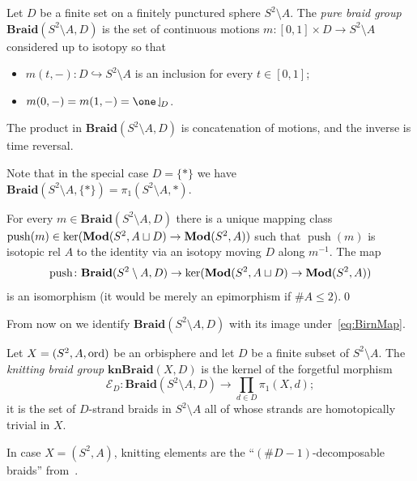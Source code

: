 \documentclass{amsart}
\newcommand\Antipush{{\mathcal E}}
\newcommand\Push{{\operatorname{push}}}
\newcommand\Braid{{\mathbf{Braid}}}
\newcommand\knBraid{{\mathbf{knBraid}}}
\begin{document}
\begin{defn}
\label{defn:PureBraidGroup}
  Let $D$ be a finite set on a finitely punctured sphere
  $S^2\setminus A$. The \emph{pure braid group} $\Braid(S^2\setminus A,D)$
  is the set of continuous motions
  $m\colon[0,1]\times D\to S^2\setminus A$ considered up to isotopy so
  that
  \begin{itemize}
  \item $m(t,-)\colon D\hookrightarrow S^2\setminus A$ is an inclusion
    for every $t\in [0,1]$;
  \item $m(0,-)=m(1,-)=\one\restrict D$.
  \end{itemize}
  The product in $\Braid(S^2\setminus A,D)$ is concatenation of
  motions, and the inverse is time reversal.
\end{defn}
\noindent Note that in the special case $D=\{*\}$ we have
$\Braid(S^2\setminus A,\{*\} )=\pi_1(S^2\setminus A, *)$.

\begin{thm}[Birman]\label{thm:BirmExistUniq}
  For every $m\in \Braid(S^2\setminus A,D)$ there is a unique mapping
  class $\Push(m)\in\ker(\Mod(S^2,A\sqcup D)\to\Mod(S^2,A))$ such that
  $\Push(m)$ is isotopic rel $A$ to the identity via an isotopy moving
  $D$ along $m^{-1}$. The map
  \begin{equation}\label{eq:BirnMap}
    \Push\colon \Braid(S^2\setminus A,D)\to\ker(\Mod(S^2,A\sqcup D)\to\Mod(S^2,A))
  \end{equation}
  is an isomorphism (it would be merely an epimorphism if $\#A\le2$).\qed
\end{thm}

\noindent From now on we identify $\Braid(S^2\setminus A,D)$ with its
image under~\eqref{eq:BirnMap}.

\begin{defn}
  Let $X= (S^2,A,\operatorname{ord})$ be an orbisphere and let $D$ be a finite
  subset of $S^2\setminus A$. The \emph{knitting braid group}
  $\knBraid(X,D)$ is the kernel of the forgetful morphism
  \[\Antipush_D\colon\Braid(S^2\setminus A, D)\to\prod_{d\in D}\pi_1(X,d);\]
  it is the set of $D$-strand braids in $S^2\setminus A$ all of whose
  strands are homotopically trivial in $X$.
\end{defn}

In case $X=(S^2,A)$, knitting elements are the
``$(\#D-1)$-decomposable braids''
from~\cite{levinson:decomposablebraids}.
\end{document}

